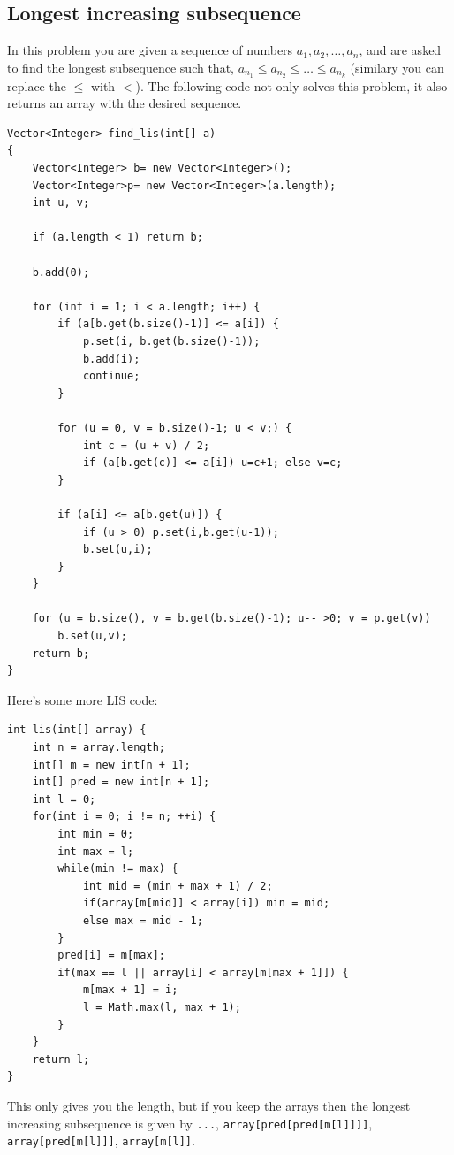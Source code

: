 \documentclass[a4paper,12pt]{article}
\begin{document}
\subsection{Longest increasing subsequence}
In this problem you are given a sequence of numbers $a_1,a_2,\dots,a_n$, and are asked to find the longest subsequence such that, $a_{n_1}\le a_{n_2}\le\dots\le a_{n_k}$ (similary you can replace the $\le$ with $<$).
The following code not only solves this problem, it also returns an array with the desired sequence.

\begin{lstlisting} 
Vector<Integer> find_lis(int[] a)
{
	Vector<Integer> b= new Vector<Integer>();
	Vector<Integer>p= new Vector<Integer>(a.length);
	int u, v;
 
	if (a.length < 1) return b;
 
	b.add(0);
 
	for (int i = 1; i < a.length; i++) {
		if (a[b.get(b.size()-1)] <= a[i]) {
			p.set(i, b.get(b.size()-1));
			b.add(i);
			continue;
		}
 
		for (u = 0, v = b.size()-1; u < v;) {
			int c = (u + v) / 2;
			if (a[b.get(c)] <= a[i]) u=c+1; else v=c;
		}
 
		if (a[i] <= a[b.get(u)]) {
			if (u > 0) p.set(i,b.get(u-1));
			b.set(u,i);
		}	
	}
 
	for (u = b.size(), v = b.get(b.size()-1); u-- >0; v = p.get(v))
		b.set(u,v);
	return b;
}
\end{lstlisting}

\noindent Here's some more LIS code:
\begin{lstlisting}
int lis(int[] array) {
	int n = array.length;
	int[] m = new int[n + 1];
	int[] pred = new int[n + 1];
	int l = 0;
	for(int i = 0; i != n; ++i) {
		int min = 0;
		int max = l;
		while(min != max) {
			int mid = (min + max + 1) / 2;
			if(array[m[mid]] < array[i]) min = mid;
			else max = mid - 1;
		}
		pred[i] = m[max];
		if(max == l || array[i] < array[m[max + 1]]) {
			m[max + 1] = i;
			l = Math.max(l, max + 1);
		}
	}
	return l;
}
\end{lstlisting}

This only gives you the length, but if you keep the arrays then the longest increasing subsequence is given by \verb/.../, \verb/array[pred[pred[m[l]]]]/, \verb/array[pred[m[l]]]/, \verb/array[m[l]]/.
\end{document}
